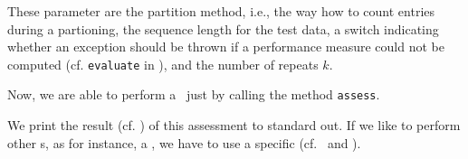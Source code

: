 These parameter are
the partition method, i.e., the way how to count entries during a partioning,
the sequence length for the test data,
a switch indicating whether an exception should be thrown if a performance measure could not be computed (cf. \lstinline+evaluate+ in \AbstractClassifier),
and the number of repeats $k$.

Now, we are able to perform a \ClassifierAssessment~just by calling the method \lstinline+assess+.


We print the result (cf. \ListResult) of this assessment to standard out. If we like to perform other \ClassifierAssessment s, as for instance, a \RepeatedHoldOutExperiment, we have to use a specific \ParameterSet (cf. \KFoldCrossValidation~and \KFoldCrossValidationAssessParameterSet).